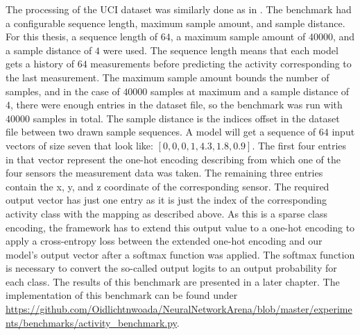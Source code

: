\documentclass[draft,final]{vutinfth} %
\begin{document}
    The processing of the UCI dataset was similarly done as in \cite{ODELSTM}.
    The benchmark had a configurable sequence length, maximum sample amount, and sample distance.
    For this thesis, a sequence length of $64$, a maximum sample amount of $40000$, and a sample distance of $4$ were used.
    The sequence length means that each model gets a history of $64$ measurements before predicting the activity corresponding to the last measurement.
    The maximum sample amount bounds the number of samples, and in the case of $40000$ samples at maximum and a sample distance of $4$, there were enough entries in the dataset file, so the benchmark was run with $40000$ samples in total.
    The sample distance is the indices offset in the dataset file between two drawn sample sequences.
    A model will get a sequence of $64$ input vectors of size seven that look like: $[0,0,0,1,4.3,1.8,0.9]$.
    The first four entries in that vector represent the one-hot encoding describing from which one of the four sensors the measurement data was taken.
    The remaining three entries contain the x, y, and z coordinate of the corresponding sensor.
    The required output vector has just one entry as it is just the index of the corresponding activity class with the mapping as described above.
    As this is a sparse class encoding, the framework has to extend this output value to a one-hot encoding to apply a cross-entropy loss between the extended one-hot encoding and our model's output vector after a softmax function was applied.
    The softmax function is necessary to convert the so-called output logits to an output probability for each class.
    The results of this benchmark are presented in a later chapter.
    The implementation of this benchmark can be found under \url{https://github.com/Oidlichtnwoada/NeuralNetworkArena/blob/master/experiments/benchmarks/activity_benchmark.py}.
\end{document}
